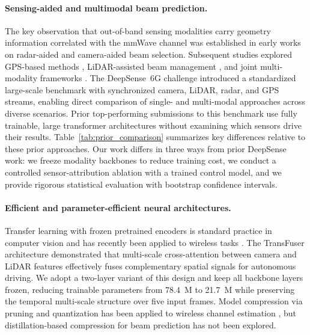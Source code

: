 \documentclass[journal,10pt,twoside]{IEEEtran}
\begin{document}
\paragraph{Sensing-aided and multimodal beam prediction.}
The key observation that out-of-band sensing modalities carry geometry
information correlated with the mmWave channel was established in early works
on radar-aided \cite{Gonzalez2021radar} and camera-aided
\cite{charan2021vision,Morais2023} beam selection. Subsequent studies
explored GPS-based methods \cite{Lim2021gps}, LiDAR-assisted beam management
\cite{dias2022lidar}, and joint multi-modality frameworks
\cite{maeng2024multimodal,salehi2022flash}. The DeepSense~6G challenge
\cite{deepsense6g_2023} introduced a standardized large-scale benchmark
with synchronized camera, LiDAR, radar, and GPS streams, enabling direct
comparison of single- and multi-modal approaches across diverse scenarios.
Prior top-performing submissions to this benchmark use fully trainable,
large transformer architectures \cite{deepsense_top2022,prakash2021transfuser}
without examining which sensors drive their results.
Table~\ref{tab:prior_comparison} summarizes key differences relative to these
prior approaches. Our work differs in three ways from prior DeepSense work:
we freeze modality backbones to reduce training cost, we conduct a controlled
sensor-attribution ablation with a trained control model, and we provide
rigorous statistical evaluation with bootstrap confidence intervals.

\paragraph{Efficient and parameter-efficient neural architectures.}
Transfer learning with frozen pretrained encoders is standard practice in
computer vision \cite{he2016deep,Chen2021SimCLR} and has recently been applied
to wireless tasks \cite{Shen2021transfer,tian2022pretrain}.
The TransFuser architecture \cite{prakash2021transfuser} demonstrated that
multi-scale cross-attention between camera and LiDAR features effectively fuses
complementary spatial signals for autonomous driving. We adopt a
two-layer variant of this design and keep all backbone layers frozen,
reducing trainable parameters from 78.4~M to 21.7~M while preserving the
temporal multi-scale structure over five input frames.
Model compression via pruning \cite{han2015deep} and quantization
\cite{Jacob2018} has been applied to wireless channel estimation
\cite{Cheng2021compress}, but distillation-based compression for beam
prediction has not been explored.
\end{document}
